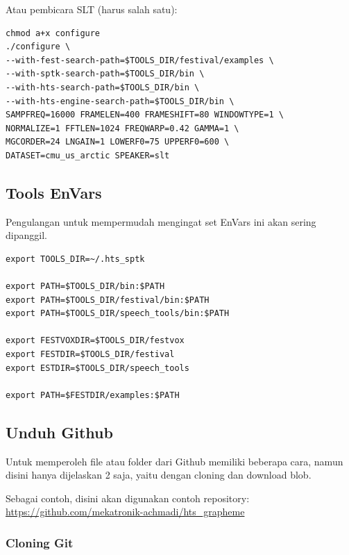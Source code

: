 \documentclass[12pt,]{article}
\begin{document}
\begin{enumerate}
		Atau pembicara SLT (harus salah satu):
		\begin{verbatim}
chmod a+x configure
./configure \
--with-fest-search-path=$TOOLS_DIR/festival/examples \
--with-sptk-search-path=$TOOLS_DIR/bin \
--with-hts-search-path=$TOOLS_DIR/bin \
--with-hts-engine-search-path=$TOOLS_DIR/bin \
SAMPFREQ=16000 FRAMELEN=400 FRAMESHIFT=80 WINDOWTYPE=1 \
NORMALIZE=1 FFTLEN=1024 FREQWARP=0.42 GAMMA=1 \
MGCORDER=24 LNGAIN=1 LOWERF0=75 UPPERF0=600 \
DATASET=cmu_us_arctic SPEAKER=slt
		\end{verbatim}

	\end{enumerate}

	\newpage
	\subsection{Tools EnVars}

	Pengulangan untuk mempermudah mengingat set EnVars ini akan sering dipanggil.

	\begin{verbatim}
export TOOLS_DIR=~/.hts_sptk

export PATH=$TOOLS_DIR/bin:$PATH
export PATH=$TOOLS_DIR/festival/bin:$PATH
export PATH=$TOOLS_DIR/speech_tools/bin:$PATH

export FESTVOXDIR=$TOOLS_DIR/festvox
export FESTDIR=$TOOLS_DIR/festival
export ESTDIR=$TOOLS_DIR/speech_tools

export PATH=$FESTDIR/examples:$PATH
	\end{verbatim}

	\subsection{Unduh Github}

	Untuk memperoleh file atau folder dari Github memiliki beberapa cara,
	namun disini hanya dijelaskan 2 saja,
	yaitu dengan cloning dan download blob.

	Sebagai contoh, disini akan digunakan contoh repository:\\
	\url{https://github.com/mekatronik-achmadi/hts_grapheme}

	\subsubsection{Cloning Git}
\end{document}
